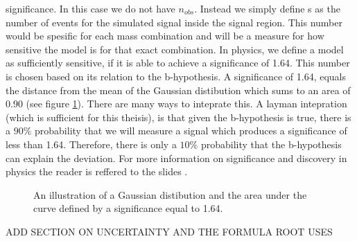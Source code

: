 significance. In this case we do not have $n_{obs}$. Instead we simply define s as the number of events for the simulated signal 
inside the signal region. This number would be spesific for each mass combination and will be a measure for how sensitive 
the model is for that exact combination. In physics, we define a model as sufficiently sensitive, if it is able to achieve a 
significance of 1.64. This number is chosen based on its relation to the b-hypothesis. A significance of 1.64, equals the 
distance from the mean of the Gaussian distibution which sums to an area of 0.90 (see figure \ref{fig:ConfInt}). There are many ways to inteprate this. A layman 
intepration (which is sufficient for this theisis), is that given the b-hypothesis is true, there is a $90\%$ probability that we will 
measure a signal which produces a significance of less than 1.64. Therefore, there is only a $10\%$ probability that the b-hypothesis
can explain the deviation. For more information on significance and discovery in physics the reader is reffered to the slides \cite{magnar}.
\begin{figure}
    \centering
    \caption{An illustration of a Gaussian distibution and the area under the curve defined by a significance equal to 1.64.}
    \label{fig:ConfInt}
\end{figure}
ADD SECTION ON UNCERTAINTY AND THE FORMULA ROOT USES
